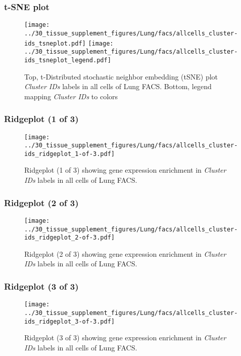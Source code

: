 \clearpage
\subsubsection{t-SNE plot}
\begin{figure}[h]
\centering
\texttt{[image: ../30\_tissue\_supplement\_figures/Lung/facs/allcells\_cluster-ids\_tsneplot.pdf]}
\texttt{[image: ../30\_tissue\_supplement\_figures/Lung/facs/allcells\_cluster-ids\_tsneplot\_legend.pdf]}
\caption{Top, t-Distributed stochastic neighbor embedding (tSNE) plot  \emph{Cluster IDs} labels in all cells of Lung FACS. Bottom, legend mapping \emph{Cluster IDs} to colors}
\end{figure}


\clearpage

\subsubsection{Ridgeplot (1 of 3)}
\begin{figure}[h]
\centering
\texttt{[image: ../30\_tissue\_supplement\_figures/Lung/facs/allcells\_cluster-ids\_ridgeplot\_1-of-3.pdf]}

\caption{ Ridgeplot (1 of 3)  showing gene expression enrichment in \emph{Cluster IDs} labels in all cells of Lung FACS. }
\end{figure}


\clearpage

\subsubsection{Ridgeplot (2 of 3)}
\begin{figure}[h]
\centering
\texttt{[image: ../30\_tissue\_supplement\_figures/Lung/facs/allcells\_cluster-ids\_ridgeplot\_2-of-3.pdf]}

\caption{ Ridgeplot (2 of 3)  showing gene expression enrichment in \emph{Cluster IDs} labels in all cells of Lung FACS. }
\end{figure}


\clearpage

\subsubsection{Ridgeplot (3 of 3)}
\begin{figure}[h]
\centering
\texttt{[image: ../30\_tissue\_supplement\_figures/Lung/facs/allcells\_cluster-ids\_ridgeplot\_3-of-3.pdf]}

\caption{ Ridgeplot (3 of 3)  showing gene expression enrichment in \emph{Cluster IDs} labels in all cells of Lung FACS. }
\end{figure}


